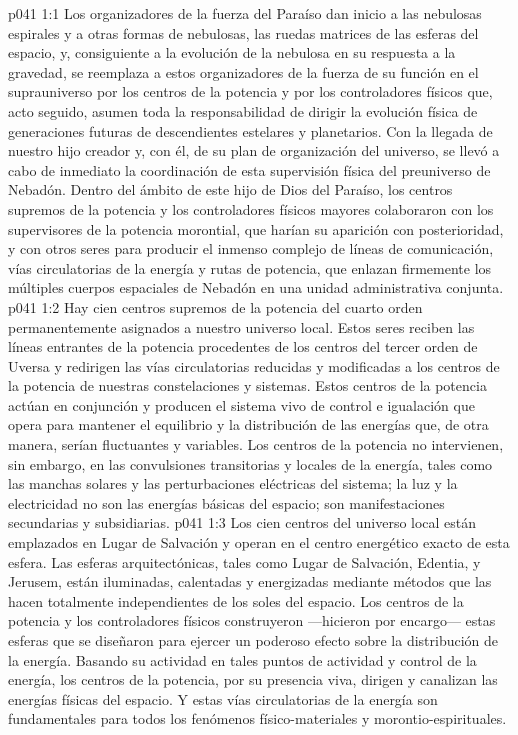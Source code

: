 \vs p041 1:1 Los organizadores de la fuerza del Paraíso dan inicio a las nebulosas espirales y a otras formas de nebulosas, las ruedas matrices de las esferas del espacio, y, consiguiente a la evolución de la nebulosa en su respuesta a la gravedad, se reemplaza a estos organizadores de la fuerza de su función en el suprauniverso por los centros de la potencia y por los controladores físicos que, acto seguido, asumen toda la responsabilidad de dirigir la evolución física de generaciones futuras de descendientes estelares y planetarios. Con la llegada de nuestro hijo creador y, con él, de su plan de organización del universo, se llevó a cabo de inmediato la coordinación de esta supervisión física del preuniverso de Nebadón. Dentro del ámbito de este hijo de Dios del Paraíso, los centros supremos de la potencia y los controladores físicos mayores colaboraron con los supervisores de la potencia morontial, que harían su aparición con posterioridad, y con otros seres para producir el inmenso complejo de líneas de comunicación, vías circulatorias de la energía y rutas de potencia, que enlazan firmemente los múltiples cuerpos espaciales de Nebadón en una unidad administrativa conjunta.
\vs p041 1:2 Hay cien centros supremos de la potencia del cuarto orden permanentemente asignados a nuestro universo local. Estos seres reciben las líneas entrantes de la potencia procedentes de los centros del tercer orden de Uversa y redirigen las vías circulatorias reducidas y modificadas a los centros de la potencia de nuestras constelaciones y sistemas. Estos centros de la potencia actúan en conjunción y producen el sistema vivo de control e igualación que opera para mantener el equilibrio y la distribución de las energías que, de otra manera, serían fluctuantes y variables. Los centros de la potencia no intervienen, sin embargo, en las convulsiones transitorias y locales de la energía, tales como las manchas solares y las perturbaciones eléctricas del sistema; la luz y la electricidad no son las energías básicas del espacio; son manifestaciones secundarias y subsidiarias.
\vs p041 1:3 Los cien centros del universo local están emplazados en Lugar de Salvación y operan en el centro energético exacto de esta esfera. Las esferas arquitectónicas, tales como Lugar de Salvación, Edentia, y Jerusem, están iluminadas, calentadas y energizadas mediante métodos que las hacen totalmente independientes de los soles del espacio. Los centros de la potencia y los controladores físicos construyeron ---hicieron por encargo--- estas esferas que se diseñaron para ejercer un poderoso efecto sobre la distribución de la energía. Basando su actividad en tales puntos de actividad y control de la energía, los centros de la potencia, por su presencia viva, dirigen y canalizan las energías físicas del espacio. Y estas vías circulatorias de la energía son fundamentales para todos los fenómenos físico\hyp{}materiales y morontio\hyp{}espirituales.
